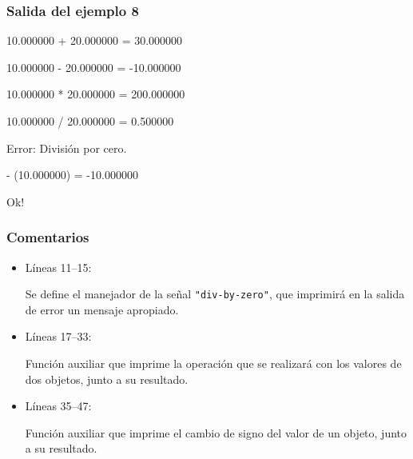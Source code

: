 \subsubsection{Salida del ejemplo 8}
10.000000 + 20.000000 = 30.000000\par
10.000000 - 20.000000 = -10.000000\par
10.000000 * 20.000000 = 200.000000\par
10.000000 / 20.000000 = 0.500000\par
\vspace{1ex}
Error: División por cero.\par
\vspace{1ex}
- (10.000000) = -10.000000\par
Ok!\par

\subsubsection{Comentarios}
\begin{itemize}
\item Líneas 11--15:\par
  Se define el manejador de la señal \texttt{"div-by-zero"}, que imprimirá en la salida
  de error un mensaje apropiado.
\item Líneas 17--33:\par
  Función auxiliar que imprime la operación que se realizará con los valores de dos
  objetos, junto a su resultado.
\item Líneas 35--47:\par
  Función auxiliar que imprime el cambio de signo del valor de un objeto, junto a su
  resultado.
\end{itemize}

                          
                            

  

